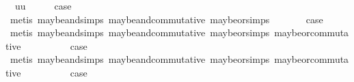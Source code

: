 \begin{isabellebody}
\isamarkupfalse%
\ {\isacharparenleft}{}\ uu{\isacharparenright}\isanewline
\ \ \isamarkupfalse%
\ \isamarkupfalse%
\ {\isacharquery}case\isanewline
\ \ \ \ \isamarkupfalse%
\ {\isacharparenleft}metis\ maybe{\isacharunderscore}and{\isachardot}simps{\isacharparenleft}{}{\isacharparenright}\ maybe{\isacharunderscore}and{\isacharunderscore}commutative\ maybe{\isacharunderscore}or{\isachardot}simps{\isacharparenleft}{}{\isacharparenright}{\isacharparenright}\isanewline
{}\isamarkupfalse%
\isanewline
{}\isamarkupfalse%
\ {\isachardoublequoteopen}{}{\isacharunderscore}{}{\isachardoublequoteclose}\isanewline
\ \ \isamarkupfalse%
\ \isamarkupfalse%
\ {\isacharquery}case\isanewline
\ \ \ \ \isamarkupfalse%
\ {\isacharparenleft}metis\ maybe{\isacharunderscore}and{\isachardot}simps{\isacharparenleft}{}{\isacharparenright}\ maybe{\isacharunderscore}and{\isacharunderscore}commutative\ maybe{\isacharunderscore}or{\isachardot}simps{\isacharparenleft}{}{\isacharparenright}\ maybe{\isacharunderscore}or{\isacharunderscore}commutative{\isacharparenright}\isanewline
{}\isamarkupfalse%
\isanewline
\ \ \isamarkupfalse%
\ {\isachardoublequoteopen}{}{\isacharunderscore}{}{\isachardoublequoteclose}\isanewline
\ \ \isamarkupfalse%
\ \isamarkupfalse%
\ {\isacharquery}case\isanewline
\ \ \ \ \isamarkupfalse%
\ {\isacharparenleft}metis\ maybe{\isacharunderscore}and{\isachardot}simps{\isacharparenleft}{}{\isacharparenright}\ maybe{\isacharunderscore}and{\isacharunderscore}commutative\ maybe{\isacharunderscore}or{\isachardot}simps{\isacharparenleft}{}{\isacharparenright}\ maybe{\isacharunderscore}or{\isacharunderscore}commutative{\isacharparenright}\isanewline
{}\isamarkupfalse%
\isanewline
\ \ \isamarkupfalse%
\ {\isachardoublequoteopen}{}{\isacharunderscore}{}{\isachardoublequoteclose}\isanewline
\ \ \isamarkupfalse%
\ \isamarkupfalse%
\ {\isacharquery}case\isanewline
\ \ \ \ \isamarkupfalse%

\end{isabellebody}
